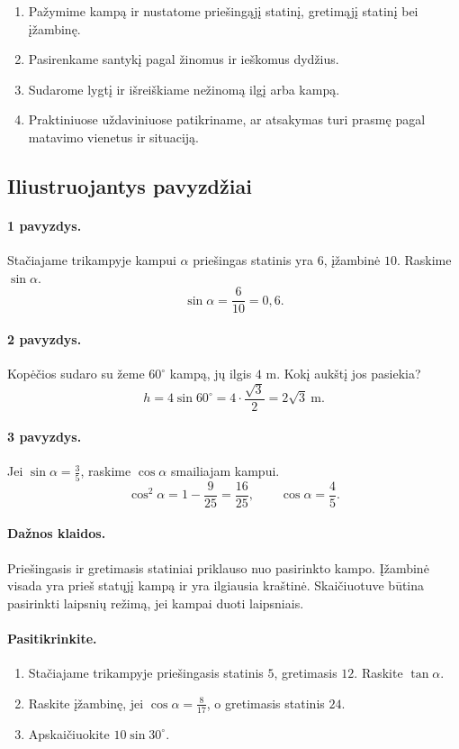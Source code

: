 \begin{enumerate}
\item Pažymime kampą ir nustatome priešingąjį statinį, gretimąjį statinį bei įžambinę.
\item Pasirenkame santykį pagal žinomus ir ieškomus dydžius.
\item Sudarome lygtį ir išreiškiame nežinomą ilgį arba kampą.
\item Praktiniuose uždaviniuose patikriname, ar atsakymas turi prasmę pagal matavimo vienetus ir situaciją.
\end{enumerate}

\subsection{Iliustruojantys pavyzdžiai}

\paragraph{1 pavyzdys.}
Stačiajame trikampyje kampui $\alpha$ priešingas statinis yra $6$, įžambinė $10$. Raskime $\sin\alpha$.
\[
\sin\alpha=\frac6{10}=0,6.
\]

\paragraph{2 pavyzdys.}
Kopėčios sudaro su žeme $60^\circ$ kampą, jų ilgis $4$ m. Kokį aukštį jos pasiekia?
\[
h=4\sin60^\circ=4\cdot\frac{\sqrt3}{2}=2\sqrt3\ \text{m}.
\]

\paragraph{3 pavyzdys.}
Jei $\sin\alpha=\frac35$, raskime $\cos\alpha$ smailiajam kampui.
\[
\cos^2\alpha=1-\frac9{25}=\frac{16}{25},\qquad \cos\alpha=\frac45.
\]

\paragraph{Dažnos klaidos.}
Priešingasis ir gretimasis statiniai priklauso nuo pasirinkto kampo. Įžambinė visada yra prieš statųjį kampą ir yra ilgiausia kraštinė. Skaičiuotuve būtina pasirinkti laipsnių režimą, jei kampai duoti laipsniais.

\paragraph{Pasitikrinkite.}
\begin{enumerate}
\item Stačiajame trikampyje priešingasis statinis $5$, gretimasis $12$. Raskite $\tan\alpha$.
\item Raskite įžambinę, jei $\cos\alpha=\frac{8}{17}$, o gretimasis statinis $24$.
\item Apskaičiuokite $10\sin30^\circ$.
\end{enumerate}

